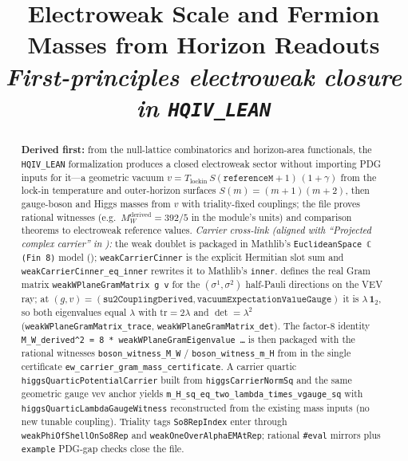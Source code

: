 \documentclass[11pt]{article}
\title{Electroweak Scale and Fermion Masses from Horizon Readouts\\[0.35em]
{\large\itshape First-principles electroweak closure in \texttt{HQIV\_LEAN}}}
\author{}
\date{}
\begin{document}
\maketitle

\begin{abstract}
\textbf{Derived first:} from the null-lattice combinatorics and horizon-area functionals, the \texttt{HQIV\_LEAN} formalization produces a closed electroweak sector without importing PDG inputs for it---a geometric vacuum $v=T_{\mathrm{lockin}}\,S(\texttt{referenceM}+1)\,(1+\gamma)$ from the lock-in temperature and outer-horizon surfaces $S(m)=(m+1)(m+2)$, then gauge-boson and Higgs masses from $v$ with triality-fixed couplings; the file proves rational witnesses (e.g.\ $M_W^{\mathrm{derived}}=392/5$ in the module's units) and comparison theorems to electroweak reference values.
\emph{Carrier cross-link (aligned with ``Projected complex carrier'' in ):}
the weak doublet is packaged in Mathlib's \texttt{EuclideanSpace\,ℂ\,(Fin\,8)} model (); \texttt{weakCarrierCinner} is the explicit Hermitian slot sum and \texttt{weakCarrierCinner\_eq\_inner} rewrites it to Mathlib's \texttt{inner}.
 defines the real Gram matrix \texttt{weakWPlaneGramMatrix\,g\,v} for the $(\sigma^1,\sigma^2)$ half-Pauli directions on the VEV ray; at $(g,v)=(\texttt{su2CouplingDerived},\texttt{vacuumExpectationValueGauge})$ it is $\lambda\,\mathbf{1}_2$, so both eigenvalues equal $\lambda$ with $\mathrm{tr}=2\lambda$ and $\det=\lambda^2$ (\texttt{weakWPlaneGramMatrix\_trace}, \texttt{weakWPlaneGramMatrix\_det}).
The factor-$8$ identity \texttt{M\_W\_derived\^{}2\,=\,8\,*\,weakWPlaneGramEigenvalue\,…} is then packaged with the rational witnesses \texttt{boson\_witness\_M\_W} / \texttt{boson\_witness\_m\_H} from  in the single certificate \texttt{ew\_carrier\_gram\_mass\_certificate}.
A carrier quartic \texttt{higgsQuarticPotentialCarrier} built from \texttt{higgsCarrierNormSq} and the same geometric gauge vev anchor yields \texttt{m\_H\_sq\_eq\_two\_lambda\_times\_vgauge\_sq} with \texttt{higgsQuarticLambdaGaugeWitness} reconstructed from the existing mass inputs (no new tunable coupling).
Triality tags \texttt{So8RepIndex} enter through \texttt{weakPhiOfShellOnSo8Rep} and \texttt{weakOneOverAlphaEMAtRep}; rational \texttt{\#eval} mirrors plus \texttt{example} PDG-gap checks close the file.

\end{abstract}
\end{document}
